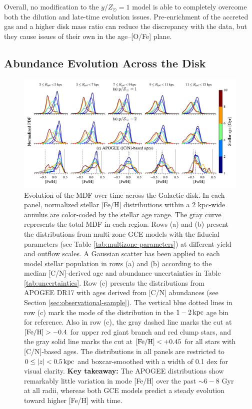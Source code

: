 \documentclass[twocolumn,twocolappendix,linenumbers]{aastex631}
\newcommand{\mathFeH}{{\rm [Fe/H]}}
\newcommand{\yZ}[1]{$y/Z_\odot=#1$}
\newcommand{\kpc}{\,{\rm kpc}}
\begin{document}
Overall, no modification to the \yZ{1} model is able to completely overcome both the dilution and late-time evolution issues. Pre-enrichment of the accreted gas and a higher disk mass ratio can reduce the discrepancy with the data, but they cause issues of their own in the age--[O/Fe] plane. 

\subsection{Abundance Evolution Across the Disk}
\label{sec:disk-evolution}

\begin{figure}
    \centering
    \includegraphics[width=\textwidth]{figures/mdf_evolution.pdf}
    \caption{Evolution of the MDF over time across the Galactic disk. In each panel, normalized stellar [Fe/H] distributions within a {2 kpc}-wide annulus are color-coded by the stellar age range. The gray curve represents the total MDF in each region. Rows (a) and (b) present the distributions from multi-zone GCE models with the fiducial parameters (see Table \ref{tab:multizone-parameters}) at different yield and outflow scales. 
    A Gaussian scatter has been applied to each model stellar population in rows (a) and (b) according to the median [C/N]-derived age and abundance uncertainties in Table \ref{tab:uncertainties}. Row (c) presents the distributions from APOGEE DR17 with ages derived from [C/N] abundances (see Section \ref{sec:observational-sample}). The vertical blue dotted lines in row (c) mark the mode of the distribution in the $1-2\kpc$ age bin for reference. Also in row (c), the gray dashed line marks the cut at $\mathFeH>-0.4$ for upper red giant branch and red clump stars, and the gray solid line marks the cut at $\mathFeH<+0.45$ for all stars with [C/N]-based ages. The distributions in all panels are restricted to $0\leq|z|<0.5\kpc$ and boxcar-smoothed with a width of {0.1 dex} for visual clarity. {\bf Key takeaway:} The APOGEE distributions show remarkably little variation in mode [Fe/H] over the past $\sim6-8$ Gyr at all radii, whereas both GCE models predict a steady evolution toward higher [Fe/H] with time.}
    \label{fig:mdf-evolution}
\end{figure}
\end{document}
